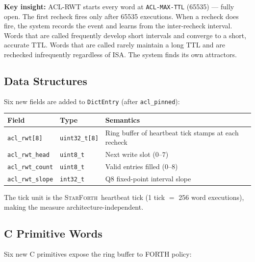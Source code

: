 \documentclass[11pt,letterpaper,openany]{article}
\newcommand{\SF}{\textsc{StarForth}\xspace}
\begin{document}
\textbf{Key insight:} ACL-RWT starts every word at \texttt{ACL-MAX-TTL}
(65535) --- fully open.  The first recheck fires only after 65535
executions.  When a recheck does fire, the system records the event
and learns from the inter-recheck interval.  Words that are called
frequently develop short intervals and converge to a short, accurate
TTL.  Words that are called rarely maintain a long TTL and are
rechecked infrequently regardless of ISA.  The system finds its own
attractors.

\subsection{Data Structures}

Six new fields are added to \texttt{DictEntry} (after
\texttt{acl\_pinned}):

\begin{center}
\begin{tabular}{llp{8cm}}
\toprule
\textbf{Field} & \textbf{Type} & \textbf{Semantics} \\
\midrule
\texttt{acl\_rwt[8]}    & \texttt{uint32\_t[8]} & Ring buffer of heartbeat tick stamps at each recheck \\
\texttt{acl\_rwt\_head} & \texttt{uint8\_t}     & Next write slot ($0$--$7$) \\
\texttt{acl\_rwt\_count}& \texttt{uint8\_t}     & Valid entries filled ($0$--$8$) \\
\texttt{acl\_rwt\_slope}& \texttt{int32\_t}     & Q8 fixed-point interval slope \\
\bottomrule
\end{tabular}
\end{center}

The tick unit is the \SF\ heartbeat tick (1 tick $=$ 256 word
executions), making the measure architecture-independent.

\subsection{C Primitive Words}

Six new C primitives expose the ring buffer to FORTH policy:
\end{document}

